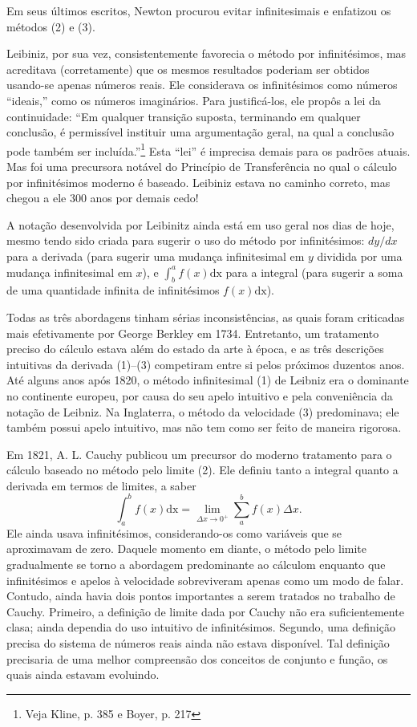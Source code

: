 \documentclass{svmono}
\begin{document}
Em seus últimos escritos, Newton procurou evitar infinitesimais e
enfatizou os métodos (2) e (3). 

Leibiniz, por sua vez, consistentemente favorecia o método por infinitésimos,
mas acreditava (corretamente) que os mesmos resultados poderiam ser
obtidos usando-se apenas números reais. Ele considerava os infinitésimos
como números ``ideais,'' como os números imaginários. Para justificá-los,
ele propôs a lei da continuidade: ``Em qualquer transição suposta,
terminando em qualquer conclusão, é permissível instituir uma argumentação
geral, na qual a conclusão pode também ser incluída.''\footnote{Veja Kline, p. 385 e Boyer, p. 217} Esta ``lei'' é imprecisa demais para os padrões
atuais. Mas foi uma precursora notável do Princípio de Transferência
no qual o cálculo por infinitésimos moderno é baseado. Leibiniz estava
no caminho correto, mas chegou a ele 300 anos por demais cedo!

A notação desenvolvida por Leibinitz ainda está em uso geral nos dias de hoje,
mesmo tendo sido criada para sugerir o uso do método por infinitésimos:
$dy/dx$ para a derivada (para sugerir uma mudança infinitesimal em $y$
dividida por uma mudança infinitesimal em $x$), e $\int_b^a f(x) \mathrm{dx}$ para a integral (para sugerir a soma de uma quantidade infinita de
infinitésimos $f(x) \mathrm{dx}$).

Todas as três abordagens tinham sérias inconsistências, as quais foram
criticadas mais efetivamente por George Berkley em 1734. Entretanto, um tratamento
preciso do cálculo estava além do estado da arte à época, e as
três descrições intuitivas da derivada (1)--(3) competiram entre si
pelos próximos duzentos anos. Até alguns anos após 1820,
o método infinitesimal (1) de Leibniz era o dominante no continente
europeu, por causa do seu apelo intuitivo e pela conveniência da
notação de Leibniz. Na Inglaterra, o método da velocidade (3)
predominava; ele também possui apelo intuitivo, mas não tem como
ser feito de maneira rigorosa.

Em 1821, A. L. Cauchy publicou um precursor do moderno tratamento para
o cálculo baseado no método pelo limite (2). Ele definiu tanto a integral
quanto a derivada em termos de limites, a saber
\[
\int_a^b f(x) \mathrm{dx} = \lim_{\Delta x \rightarrow 0^+} \sum_{a}^{b} f(x) \Delta x.
\]
Ele ainda usava infinitésimos, considerando-os como variáveis que
se aproximavam de zero. Daquele momento em diante, o método pelo
limite gradualmente se torno a abordagem predominante ao cálculom
enquanto que infinitésimos e apelos à velocidade sobreviveram apenas
como um modo de falar. Contudo, ainda havia dois pontos importantes a serem
tratados no trabalho de Cauchy. Primeiro, a definição de limite dada por
Cauchy não era suficientemente clasa; ainda dependia do uso intuitivo
de infinitésimos. Segundo, uma definição precisa do sistema de números
reais ainda não estava disponível. Tal definição precisaria de uma
melhor compreensão dos conceitos de conjunto e função, os quais ainda
estavam evoluindo.
\end{document}
